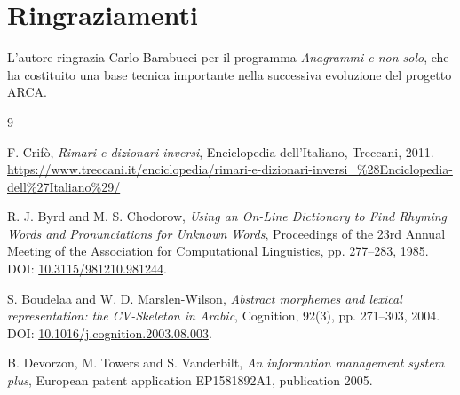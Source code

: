 \documentclass[11pt,a4paper]{article}
\theoremstyle{definition}
\theoremstyle{remark}
\begin{document}
\section*{Ringraziamenti}

L'autore ringrazia Carlo Barabucci per il programma \emph{Anagrammi e non solo}, che ha costituito una base tecnica importante nella successiva evoluzione del progetto ARCA.

\begin{thebibliography}{9}

F. Crifò,
\emph{Rimari e dizionari inversi},
Enciclopedia dell'Italiano, Treccani, 2011.
\url{https://www.treccani.it/enciclopedia/rimari-e-dizionari-inversi_%28Enciclopedia-dell%27Italiano%29/}

R. J. Byrd and M. S. Chodorow,
\emph{Using an On-Line Dictionary to Find Rhyming Words and Pronunciations for Unknown Words},
Proceedings of the 23rd Annual Meeting of the Association for Computational Linguistics, pp. 277--283, 1985.
DOI: \href{https://doi.org/10.3115/981210.981244}{10.3115/981210.981244}.

S. Boudelaa and W. D. Marslen-Wilson,
\emph{Abstract morphemes and lexical representation: the CV-Skeleton in Arabic},
Cognition, 92(3), pp. 271--303, 2004.
DOI: \href{https://doi.org/10.1016/j.cognition.2003.08.003}{10.1016/j.cognition.2003.08.003}.

B. Devorzon, M. Towers and S. Vanderbilt,
\emph{An information management system plus},
European patent application EP1581892A1, publication 2005.

\end{thebibliography}
\end{document}
